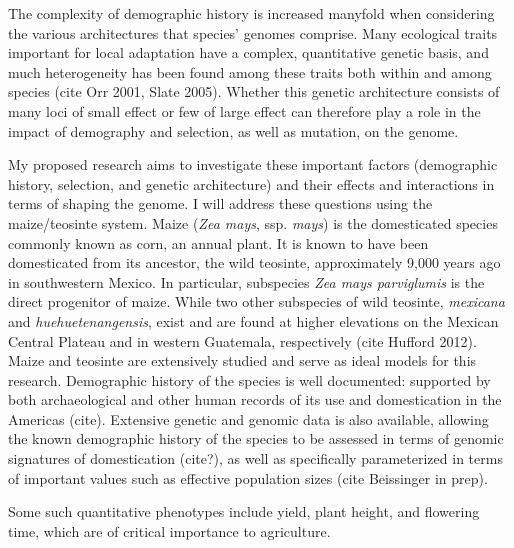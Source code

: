 The complexity of demographic history is increased manyfold when considering the various architectures that species' genomes comprise. Many ecological traits important for local adaptation have a complex, quantitative genetic basis, and much heterogeneity has been found among these traits both within and among species (cite Orr 2001, Slate 2005). Whether this genetic architecture consists of many loci of small effect or few of large effect can therefore play a role in the impact of demography and selection, as well as mutation, on the genome.

My proposed research aims to investigate these important factors (demographic history, selection, and genetic architecture) and their effects and interactions in terms of shaping the genome. I will address these questions using the maize/teosinte system. Maize (\emph{Zea mays}, ssp. \emph{mays}) is the domesticated species commonly known as corn, an annual plant. It is known to have been domesticated from its ancestor, the wild teosinte, approximately 9,000 years ago in southwestern Mexico. In particular, subspecies \emph{Zea mays parviglumis} is the direct progenitor of maize. While two other subspecies of wild teosinte, \emph{mexicana} and \emph{huehuetenangensis}, exist and are found at higher elevations on the Mexican Central Plateau and in western Guatemala, respectively (cite Hufford 2012). Maize and teosinte are extensively studied and serve as ideal models for this research. Demographic history of the species is well documented: supported by both archaeological and other human records of its use and domestication in the Americas (cite). Extensive genetic and genomic data is also available, allowing the known demographic history of the species to be assessed in terms of genomic signatures of domestication (cite?), as well as specifically parameterized in terms of important values such as effective population sizes (cite Beissinger in prep).




Some such quantitative phenotypes include yield, plant height, and flowering time, which are of critical importance to agriculture.  

